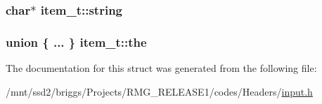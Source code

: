 \hypertarget{structitem__t_a681fe9fd0c7699b611d70e04066aff43}{
\subsubsection[{string}]{\setlength{\rightskip}{0pt plus 5cm}char$\ast$ item\-\_\-t\-::string}}\label{structitem__t_a681fe9fd0c7699b611d70e04066aff43}
\hypertarget{structitem__t_ac3d4dafb4c38d619efae2e8ac701dffc}{
\subsubsection[{the}]{\setlength{\rightskip}{0pt plus 5cm}union \{ ... \}   item\-\_\-t\-::the}}\label{structitem__t_ac3d4dafb4c38d619efae2e8ac701dffc}


The documentation for this struct was generated from the following file\-:\begin{DoxyCompactItemize}
\item 
/mnt/ssd2/briggs/\-Projects/\-R\-M\-G\-\_\-\-R\-E\-L\-E\-A\-S\-E1/codes/\-Headers/\hyperlink{input_8h}{input.\-h}\end{DoxyCompactItemize}
